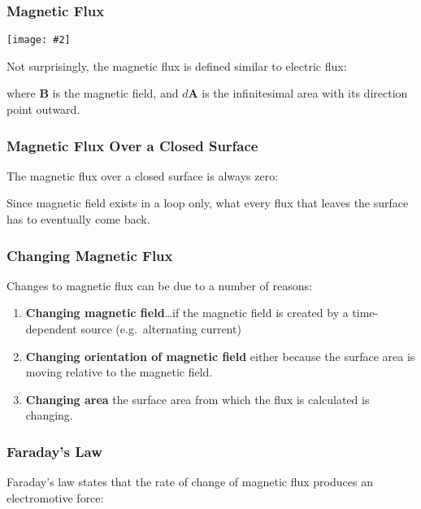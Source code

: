 \documentclass[12pt,aspectratio=169]{beamer}
\newcommand{\pic}[2]{\texttt{[image: \#2]}}
\newcommand{\mb}[1]{\mathbf{#1}}
\newcommand{\eq}[2]{\vspace{#1}{\Large\begin{displaymath}#2\end{displaymath}}}
\begin{document}
\begin{frame}
  \frametitle{Magnetic Flux}
  \begin{center}
    \pic{.4}{flux2.png}
  \end{center}

  

  \vspace{-.15in}Not surprisingly, the magnetic flux is defined similar to
  electric flux:
  
  \eq{-.2in}{
    \boxed{\Phi_\mathrm{magnetic}=\int\mb{B}\cdot d\mb{A}}
  }

  where $\mb{B}$ is the magnetic field, and $d\mb{A}$ is the infinitesimal area
  with its direction point outward.
\end{frame}

\begin{frame}
  \frametitle{Magnetic Flux Over a Closed Surface}

  The magnetic flux over a closed surface is always zero:

  \eq{-.2in}{
    \boxed{\oint\mb{B}\cdot d\mb{A}=0}
  }

  Since magnetic field exists in a loop only, what every flux that leaves the
  surface has to eventually come back.
\end{frame}


\begin{frame}
  \frametitle{Changing Magnetic Flux}
  Changes to magnetic flux can be due to a number of reasons:
  \begin{enumerate}
  \item\textbf{Changing magnetic field}\ldots if the magnetic field is created
    by a time-dependent source (e.g.\ alternating current)
  \item\textbf{Changing orientation of magnetic field} either because the
    surface area is moving relative to the magnetic field.
  \item\textbf{Changing area} the surface area from which the flux is
    calculated is changing.
  \end{enumerate}
\end{frame}


\begin{frame}
  \frametitle{Faraday's Law}
  Faraday's law states that the rate of change of magnetic flux produces an
  electromotive force:

  \eq{-.2in}{
    \boxed{\mathcal{E}=-\frac{d\Phi}{dt}}
  }
\end{frame}
\end{document}
